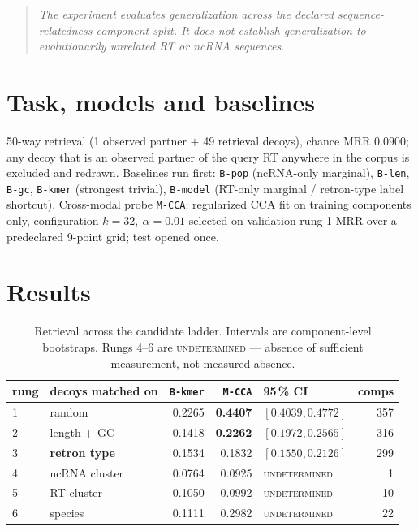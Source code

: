 \documentclass[11pt,a4paper]{article}
\begin{document}
\begin{quote}\itshape The experiment evaluates generalization across the declared
sequence-relatedness component split. It does not establish generalization to evolutionarily
unrelated RT or ncRNA sequences.\end{quote}

\section{Task, models and baselines}
50-way retrieval (1 observed partner $+$ 49 retrieval decoys), chance MRR $0.0900$; any decoy
that is an observed partner of the query RT anywhere in the corpus is excluded and redrawn.
Baselines run first: \texttt{B-pop} (ncRNA-only marginal), \texttt{B-len}, \texttt{B-gc},
\texttt{B-kmer} (strongest trivial), \texttt{B-model} (RT-only marginal / retron-type label
shortcut). Cross-modal probe \texttt{M-CCA}: regularized CCA fit on training components only,
configuration $k=32,\ \alpha=0.01$ selected on validation rung-1 MRR over a predeclared 9-point
grid; test opened once.

\section{Results}
\begin{table}[h]\centering\small
\begin{tabular}{llrrlr}\toprule
rung & decoys matched on & \texttt{B-kmer} & \textbf{\texttt{M-CCA}} & 95\,\% CI & comps \\\midrule
1 & random & 0.2265 & \textbf{0.4407} & $[0.4039,0.4772]$ & 357 \\
2 & length + GC & 0.1418 & \textbf{0.2262} & $[0.1972,0.2565]$ & 316 \\
3 & \textbf{retron type} & 0.1534 & 0.1832 & $[0.1550,0.2126]$ & 299 \\
4 & ncRNA cluster & 0.0764 & 0.0925 & \textsc{undetermined} & 1 \\
5 & RT cluster & 0.1050 & 0.0992 & \textsc{undetermined} & 10 \\
6 & species & 0.1111 & 0.2982 & \textsc{undetermined} & 22 \\\bottomrule
\end{tabular}\caption{Retrieval across the candidate ladder. Intervals are component-level
bootstraps. Rungs 4--6 are \textsc{undetermined} --- absence of sufficient measurement, not
measured absence.}\end{table}
\end{document}
